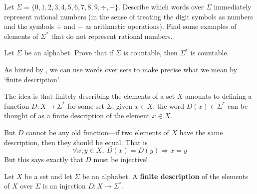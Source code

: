 \begin{exercise}
Let $\Sigma = \{ 0,1,2,3,4,5,6,7,8,9,{\div},{-} \}$. Describe which words over $\Sigma$ immediately represent rational numbers (in the sense of treating the digit symbols as numbers and the symbols $\div$ and $-$ as arithmetic operations). Find some examples of elements of $\Sigma^*$ that do not represent rational numbers.
\end{exercise}

\begin{exercise}
Let $\Sigma$ be an alphabet. Prove that if $\Sigma$ is countable, then $\Sigma^*$ is countable.
\end{exercise}

As hinted by , we can use words over sets to make precise what we mean by `finite description'.

The idea is that finitely describing the elements of a set $X$ amounts to defining a function $D : X \to \Sigma^*$ for some set $\Sigma$; given $x \in X$, the word $D(x) \in \Sigma^*$ can be thought of as a finite description of the element $x \in X$.

But $D$ cannot be any old function---if two elements of $X$ have the same description, then they should be equal. That is
\[ \forall x,y \in X,~ D(x) = D(y) \Rightarrow x=y \]
But this says exactly that $D$ must be injective!

\begin{definition}
\label{defFiniteDescription}
Let $X$ be a set and let $\Sigma$ be an alphabet. A \textbf{finite description} of the elements of $X$ over $\Sigma$ is an injection $D : X \to \Sigma^*$.
\end{definition}

